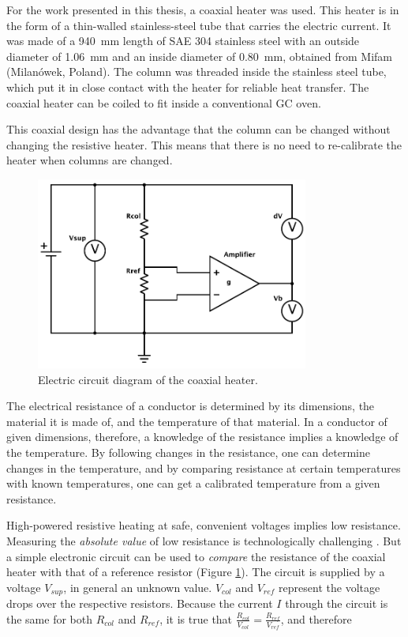 For the work presented in this thesis, a coaxial heater was used. This heater is
in the form of a thin-walled stainless-steel tube that carries the electric
current. It was made of a \SI{940}{\milli\metre} length of SAE 304 stainless
steel with an outside diameter of \SI{1.06}{\milli\metre} and an inside diameter
of \SI{0.80}{\milli\metre}, obtained from Mifam (Milanówek, Poland). The column
was threaded inside the stainless steel tube, which put it in close contact with
the heater for reliable heat transfer. The coaxial heater can be coiled to
fit inside a conventional GC oven.

This coaxial design has the advantage that the column can be changed without
changing the resistive heater. This means that there is no need to re-calibrate
the heater when columns are changed.

\begin{figure}[htbp]
	\centering
	\includegraphics[width=0.8\textwidth]{Figures/Column-Heater.pdf}
	\decoRule
	\caption[Coaxial heater resistance heater]{\label{fig:HeaterDiagram}Electric circuit diagram of the coaxial heater.}
\end{figure}

The electrical resistance of a conductor is determined by its dimensions, the
material it is made of, and the temperature of that material. In a conductor of
given dimensions, therefore, a knowledge of the resistance implies a knowledge
of the temperature. By following changes in the resistance, one can determine
changes in the temperature, and by comparing resistance at certain temperatures
with known temperatures, one can get a calibrated temperature from a given
resistance.

High-powered resistive heating at safe, convenient voltages implies low
resistance. Measuring the \emph{absolute value} of low resistance is
technologically challenging \autocite{Dyos2012}. But a simple electronic circuit
can be used to \emph{compare} the resistance of the coaxial heater with that of
a reference resistor (Figure \ref{fig:HeaterDiagram}). The circuit is supplied
by a voltage \(V_{sup}\), in general an unknown value. \(V_{col}\) and
\(V_{ref}\) represent the voltage drops over the respective resistors. Because
the current \(I\) through the circuit is the same for both \(R_{col}\) and
\(R_{ref}\), it is true that \(\frac{R_{col}}{V_{col}} = \frac{ R_{ref} }{
V_{ref} }\), and therefore

